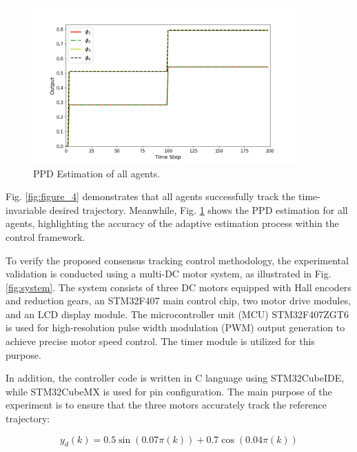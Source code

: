 \documentclass[journal,onecolumn]{IEEEtran}
\begin{document}
\begin{figure}[H]
    \centering
    \includegraphics[width=0.9\textwidth]{Figure_5.png}
    \caption{PPD Estimation of all agents.}
    \label{fig:figure_5} %
\end{figure}

Fig. \ref{fig:figure_4} demonstrates that all agents successfully track the time-invariable desired trajectory. Meanwhile, Fig. \ref{fig:figure_5} shows the PPD estimation for all agents, highlighting the accuracy of the adaptive estimation process within the control framework.





To verify the proposed consensus tracking control methodology, the experimental validation is conducted using a multi-DC motor system, as illustrated in Fig. \ref{fig:system}. The system consists of three DC motors equipped with Hall encoders and reduction
gears, an STM32F407 main control chip, two motor drive modules, and an LCD display module. The microcontroller unit (MCU) STM32F407ZGT6 is used for high-resolution pulse width modulation (PWM) output generation to achieve precise motor speed control. The timer module is utilized for this purpose.

In addition, the controller code is written in C language using STM32CubeIDE, while STM32CubeMX is used for pin configuration. The main purpose of the experiment is to ensure that the three motors accurately track the reference trajectory:

\[ y_d(k)=0.5\sin(0.07\pi(k))+0.7\cos(0.04\pi(k)) \]
\end{document}
